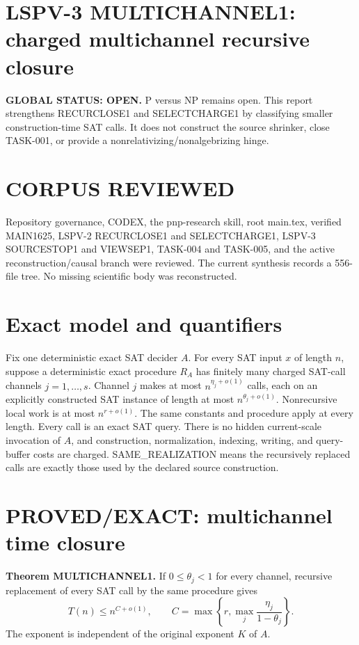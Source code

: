 \documentclass[11pt]{article}
\begin{document}
\section*{LSPV-3 MULTICHANNEL1: charged multichannel recursive closure}
\textbf{GLOBAL STATUS: OPEN.} P versus NP remains open. This report strengthens RECURCLOSE1 and SELECTCHARGE1 by classifying smaller construction-time SAT calls. It does not construct the source shrinker, close TASK-001, or provide a nonrelativizing/nonalgebrizing hinge.

\section*{CORPUS REVIEWED}
Repository governance, CODEX, the pnp-research skill, root main.tex, verified MAIN1625, LSPV-2 RECURCLOSE1 and SELECTCHARGE1, LSPV-3 SOURCESTOP1 and VIEWSEP1, TASK-004 and TASK-005, and the active reconstruction/causal branch were reviewed. The current synthesis records a 556-file tree. No missing scientific body was reconstructed.

\section*{Exact model and quantifiers}
Fix one deterministic exact SAT decider \(A\). For every SAT input \(x\) of length \(n\), suppose a deterministic exact procedure \(R_A\) has finitely many charged SAT-call channels \(j=1,\ldots,s\). Channel \(j\) makes at most \(n^{\eta_j+o(1)}\) calls, each on an explicitly constructed SAT instance of length at most \(n^{\theta_j+o(1)}\). Nonrecursive local work is at most \(n^{r+o(1)}\). The same constants and procedure apply at every length. Every call is an exact SAT query. There is no hidden current-scale invocation of \(A\), and construction, normalization, indexing, writing, and query-buffer costs are charged. SAME\_REALIZATION means the recursively replaced calls are exactly those used by the declared source construction.

\section*{PROVED/EXACT: multichannel time closure}
\textbf{Theorem MULTICHANNEL1.}
If \(0\le\theta_j<1\) for every channel, recursive replacement of every SAT call by the same procedure gives
\[
\boxed{T(n)\le n^{C+o(1)},\qquad C=\max\left\{r,\max_j\frac{\eta_j}{1-\theta_j}\right\}.}
\]
The exponent is independent of the original exponent \(K\) of \(A\).
\end{document}
